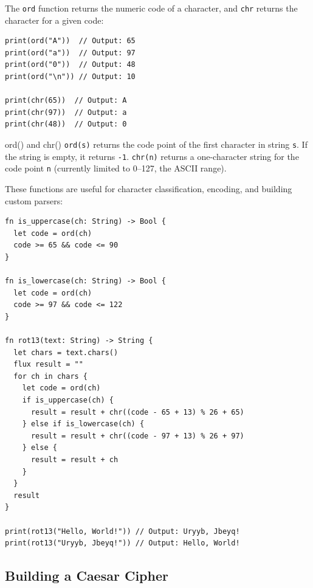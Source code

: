 The \lstinline|ord| function returns the numeric code of a character, and \lstinline|chr| returns the character for a given code:

\begin{lstlisting}[language=Lattice, caption={Converting between characters and codes}]
print(ord("A"))  // Output: 65
print(ord("a"))  // Output: 97
print(ord("0"))  // Output: 48
print(ord("\n")) // Output: 10

print(chr(65))  // Output: A
print(chr(97))  // Output: a
print(chr(48))  // Output: 0
\end{lstlisting}

\begin{defnbox}{ord() and chr()}
\lstinline|ord(s)| returns the code point of the first character in string \lstinline|s|. If the string is empty, it returns \lstinline|-1|. \lstinline|chr(n)| returns a one-character string for the code point \lstinline|n| (currently limited to 0--127, the ASCII range).
\end{defnbox}

These functions are useful for character classification, encoding, and building custom parsers:

\begin{lstlisting}[language=Lattice, caption={Character classification with ord}]
fn is_uppercase(ch: String) -> Bool {
  let code = ord(ch)
  code >= 65 && code <= 90
}

fn is_lowercase(ch: String) -> Bool {
  let code = ord(ch)
  code >= 97 && code <= 122
}

fn rot13(text: String) -> String {
  let chars = text.chars()
  flux result = ""
  for ch in chars {
    let code = ord(ch)
    if is_uppercase(ch) {
      result = result + chr((code - 65 + 13) % 26 + 65)
    } else if is_lowercase(ch) {
      result = result + chr((code - 97 + 13) % 26 + 97)
    } else {
      result = result + ch
    }
  }
  result
}

print(rot13("Hello, World!")) // Output: Uryyb, Jbeyq!
print(rot13("Uryyb, Jbeyq!")) // Output: Hello, World!
\end{lstlisting}

\subsection{Building a Caesar Cipher}\label{sec:caesar-cipher}

